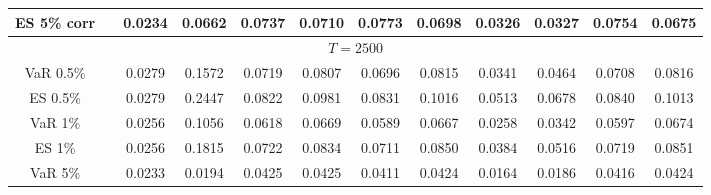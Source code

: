 {{\begin{sidewaystable}
\begin{tabular}{cc cc | cccc | cccc}
ES 5\% corr && 0.0234 & 0.0662 & 0.0737 & 0.0710 & 0.0773 & 0.0698 &0.0326 & 0.0327 & 0.0754 & 0.0675 \\ 
\hline 
\multicolumn{12}{c}{$T =2500$}  \\ 
\hline 
VaR 0.5\%
&& 0.0279 & 0.1572 & 0.0719 & 0.0807 & 0.0696 & 0.0815 &0.0341 & 0.0464 & 0.0708 & 0.0816 \\ 
ES 0.5\% 
 && 0.0279 & 0.2447 & 0.0822 & 0.0981 & 0.0831 & 0.1016 &0.0513 & 0.0678 & 0.0840 & 0.1013 \\ 
\rowcolor{LightCyan} 
VaR 1\%
 && 0.0256 & 0.1056 & 0.0618 & 0.0669 & 0.0589 & 0.0667 &0.0258 & 0.0342 & 0.0597 & 0.0674 \\ 
\rowcolor{LightCyan} 
ES 1\% 
&& 0.0256 & 0.1815 & 0.0722 & 0.0834 & 0.0711 & 0.0850 &0.0384 & 0.0516 & 0.0719 & 0.0851 \\ 
VaR 5\% 
&& 0.0233 & 0.0194 & 0.0425 & 0.0425 & 0.0411 & 0.0424 &0.0164 & 0.0186 & 0.0416 & 0.0424 \\ 

\end{tabular}
\end{sidewaystable}}}
